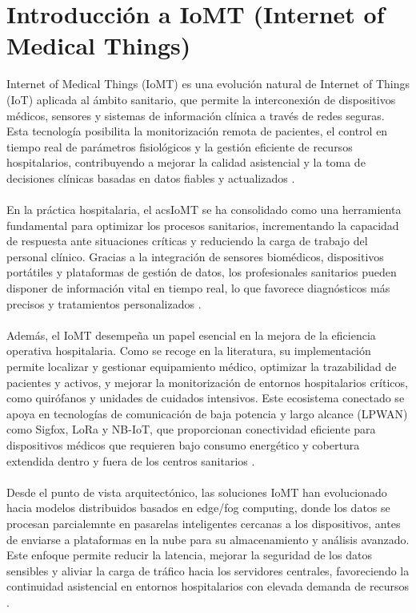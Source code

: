 \section{Introducción a IoMT (Internet of Medical Things)}
Internet of Medical Things (\acs{IoMT}) es una evolución natural de Internet of Things (\acs{IoT}) aplicada al ámbito sanitario, que permite la interconexión de dispositivos médicos, 
sensores y sistemas de información clínica a través de redes seguras. Esta tecnología posibilita la monitorización remota de pacientes, el control en tiempo real de 
parámetros fisiológicos y la gestión eficiente de recursos hospitalarios, contribuyendo a mejorar la calidad asistencial y la toma de decisiones clínicas basadas en datos 
fiables y actualizados \cite{articulo2} \cite{articulo3}. \\ \\

En la práctica hospitalaria, el acs{IoMT} se ha consolidado como una herramienta fundamental para optimizar los procesos sanitarios, incrementando la capacidad de respuesta ante situaciones
críticas y reduciendo la carga de trabajo del personal clínico. Gracias a la integración de sensores biomédicos, dispositivos portátiles y plataformas de gestión de datos, 
los profesionales sanitarios pueden disponer de información vital en tiempo real, lo que favorece diagnósticos más precisos y tratamientos personalizados \cite{articulo3}. \\ \\

Además, el \acs{IoMT} desempeña un papel esencial en la mejora de la eficiencia operativa hospitalaria. Como se recoge en la literatura, su implementación permite localizar y gestionar
equipamiento médico, optimizar la trazabilidad de pacientes y activos, y mejorar la monitorización de entornos hospitalarios críticos, como quirófanos y unidades de cuidados intensivos.
Este ecosistema conectado se apoya en tecnologías de comunicación de baja potencia y largo alcance (\acs{LPWAN}) como Sigfox, \acs{LoRa} y \acs{NB-IoT}, que proporcionan conectividad eficiente para
dispositivos médicos que requieren bajo consumo energético y cobertura extendida dentro y fuera de los centros sanitarios \cite{articulo2}. \\ \\

Desde el punto de vista arquitectónico, las soluciones \acs{IoMT} han evolucionado hacia modelos distribuidos basados en edge/fog computing, donde los datos se procesan parcialemnte
en pasarelas inteligentes cercanas a los dispositivos, antes de enviarse a plataformas en la nube para su almacenamiento y análisis avanzado. Este enfoque permite reducir la 
latencia, mejorar la seguridad de los datos sensibles y aliviar la carga de tráfico hacia los servidores centrales, favoreciendo la continuidad asistencial en entornos hospitalarios
con elevada demanda de recursos \cite{articulo1} \cite{articulo3}. \\ \\

